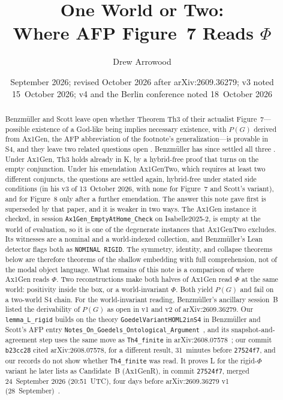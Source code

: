 \documentclass[11pt,a4paper]{article}
\title{One World or Two:\\
Where AFP Figure~7 Reads $\Phi$}
\author{Drew Arrowood}
\date{September 2026; revised October 2026 after arXiv:2609.36279; v3 noted 15~October 2026; v4 and the Berlin conference noted 18~October 2026}
\newcommand{\lean}[1]{\texttt{#1}}
\theoremstyle{definition}
\theoremstyle{remark}
\begin{document}
\maketitle

\begin{abstract}
Benzm\"uller and Scott leave open whether Theorem Th3 of their actualist
Figure~7---possible existence of a God-like being implies necessary
existence, with \(P(G)\) derived from Ax1Gen, the AFP abbreviation of the
footnote's generalization---is provable in S4, and they leave two related
questions open \cite{benzmuellerScott2025}.
Benzm\"uller has since settled all three \cite{benzmuellerPWN2026}.
Under Ax1Gen, Th3 holds already in K, by a hybrid-free proof that turns on
the empty conjunction.
Under his emendation Ax1GenTwo, which requires at least two different
conjuncts, the questions are settled again, hybrid-free under stated side
conditions (in his v3 of 13~October 2026, with none for Figure~7 and Scott's
variant), and for Figure~8 only after a further emendation.
The answer this note gave first is superseded by that paper, and it is weaker
in two ways.
The Ax1Gen instance it checked, in session
\lean{Ax1Gen\_EmptyAtHome\_Check} on Isabelle2025-2, is empty at the world
of evaluation, so it is one of the degenerate instances that Ax1GenTwo
excludes.
Its witnesses are a nominal and a world-indexed collection, and Benzm\"uller's
Lean detector flags both as \lean{NOMINAL RIGID}.
The symmetry, identity, and collapse theorems below are therefore theorems
of the shallow embedding with full comprehension, not of the modal object
language.
What remains of this note is a comparison of where Ax1Gen reads \(\Phi\).
Two reconstructions make both halves of Ax1Gen read \(\Phi\) at the same
world: positivity inside the box, or a world-invariant \(\Phi\).
Both yield \(P(G)\) and fail on a two-world S4 chain.
For the world-invariant reading, Benzm\"uller's ancillary session~B listed the
derivability of \(P(G)\) as open in v1 and v2 of arXiv:2609.36279.
Our \lean{lemma\_L\_rigid} builds on the theory \lean{GoedelVariantHOML2inS4} in Benzm\"uller and Scott's AFP entry \lean{Notes\_On\_Goedels\_Ontological\_Argument}~\cite{afpNotes2025}, and its snapshot-and-agreement step uses the same move as \lean{Th4\_finite} in arXiv:2608.07578~\cite{benzmueller2026}; our commit \lean{b23cc28} cited arXiv:2608.07578, for a different result, 31~minutes before \lean{27524f7}, and our records do not show whether \lean{Th4\_finite} was read.
It proves L for the rigid-\(\Phi\) variant he later lists as Candidate~B (Ax1GenR), in commit \lean{27524f7}, merged 24~September 2026 (20:51~UTC), four days before arXiv:2609.36279 v1 (28~September)~\cite{benzmuellerPWN2026}.

\end{abstract}
\end{document}
